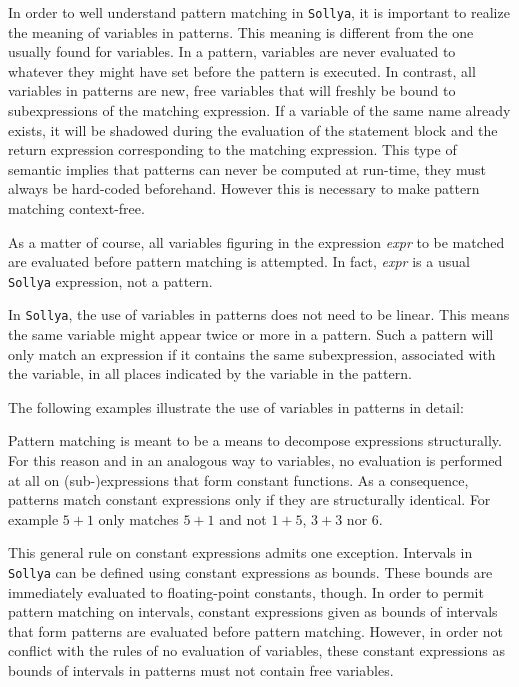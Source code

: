 \documentclass[a4paper]{article}
\newcommand{\sollya}{\texttt{Sollya}\xspace}
\begin{document}
In order to well understand pattern matching in \sollya, it is
important to realize the meaning of variables in patterns. This
meaning is different from the one usually found for variables. In a
pattern, variables are never evaluated to whatever they might have set
before the pattern is executed. In contrast, all variables in patterns
are new, free variables that will freshly be bound to subexpressions
of the matching expression. If a variable of the same name already
exists, it will be shadowed during the evaluation of the statement
block and the return expression corresponding to the matching
expression. This type of semantic implies that patterns can never be
computed at run-time, they must always be hard-coded
beforehand. However this is necessary to make pattern matching
context-free.

As a matter of course, all variables figuring in the expression {\it
  expr} to be matched are evaluated before pattern matching is
attempted. In fact, {\it expr} is a usual \sollya expression, not a
pattern.

In \sollya, the use of variables in patterns does not need to be
linear. This means the same variable might appear twice or more in a
pattern. Such a pattern will only match an expression if it contains
the same subexpression, associated with the variable, in all places
indicated by the variable in the pattern.

The following examples illustrate the use of variables in patterns in
detail:





Pattern matching is meant to be a means to decompose expressions
structurally. For this reason and in an analogous way to variables, no
evaluation is performed at all on (sub-)expressions that form constant
functions. As a consequence, patterns match constant expressions
only if they are structurally identical. For example $5 + 1$ only
matches $5 + 1$ and not $1 + 5$, $3 + 3$ nor $6$.

This general rule on constant expressions admits one exception.
Intervals in \sollya can be defined using constant expressions as
bounds. These bounds are immediately evaluated to floating-point
constants, though. In order to permit pattern matching on intervals,
constant expressions given as bounds of intervals that form patterns
are evaluated before pattern matching. However, in order not conflict
with the rules of no evaluation of variables, these constant
expressions as bounds of intervals in patterns must not contain free
variables.
\end{document}
